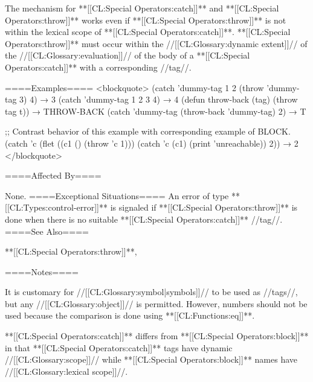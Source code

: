 The mechanism for **[[CL:Special Operators:catch]]** and **[[CL:Special Operators:throw]]** works even if **[[CL:Special Operators:throw]]** is not within the lexical scope of **[[CL:Special Operators:catch]]**. **[[CL:Special Operators:throw]]** must occur within the //[[CL:Glossary:dynamic extent]]// of the //[[CL:Glossary:evaluation]]// of the body of a **[[CL:Special Operators:catch]]** with a corresponding //tag//.

====Examples==== <blockquote> (catch 'dummy-tag 1 2 (throw 'dummy-tag 3) 4) → 3 (catch 'dummy-tag 1 2 3 4) → 4 (defun throw-back (tag) (throw tag t)) → THROW-BACK (catch 'dummy-tag (throw-back 'dummy-tag) 2) → T

;; Contrast behavior of this example with corresponding example of BLOCK. (catch 'c (flet ((c1 () (throw 'c 1))) (catch 'c (c1) (print 'unreachable)) 2)) → 2 </blockquote>

====Affected By====

None. ====Exceptional Situations==== An error of type **[[CL:Types:control-error]]** is signaled if **[[CL:Special Operators:throw]]** is done when there is no suitable **[[CL:Special Operators:catch]]** //tag//. ====See Also====

**[[CL:Special Operators:throw]]**, {\secref\Evaluation}

====Notes====

It is customary for //[[CL:Glossary:symbol|symbols]]// to be used as //tags//, but any //[[CL:Glossary:object]]// is permitted. However, numbers should not be used because the comparison is done using **[[CL:Functions:eq]]**.

**[[CL:Special Operators:catch]]** differs from **[[CL:Special Operators:block]]** in that **[[CL:Special Operators:catch]]** tags have dynamic //[[CL:Glossary:scope]]// while **[[CL:Special Operators:block]]** names have //[[CL:Glossary:lexical scope]]//.



